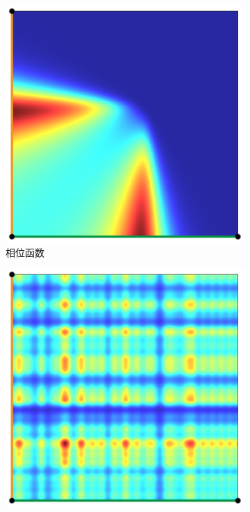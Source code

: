 \begin{figure}
\begin{fullwidth}
	\begin{subfigure}[b]{0.19\thewidth}
		\includegraphics[width=1.0\textwidth]{figures/ir/vrl-phase-function}
		\caption{相位函数}
	\end{subfigure}
	\begin{subfigure}[b]{0.19\thewidth}
		\includegraphics[width=1.0\textwidth]{figures/ir/vrl-scattering}

\end{subfigure}
\end{fullwidth}
\end{figure}
